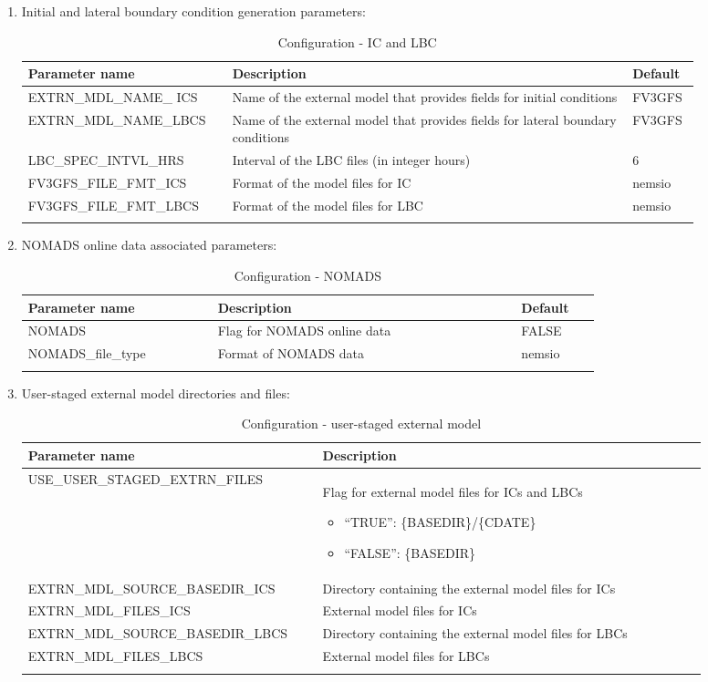 \documentclass[11pt,fleqn]{report}              %
\begin{document}
\begin{enumerate}
\item Initial and lateral boundary condition generation parameters:
{
\scriptsize
\begin{longtable}{p{0.25\linewidth} | p{0.55\linewidth} | p{0.08\linewidth}}
\hline
\hline
Parameter name & Description & Default \\
\hline
EXTRN\_MDL\_NAME\_ ICS & Name of the external model that provides fields for initial conditions & FV3GFS \\
EXTRN\_MDL\_NAME\_LBCS & Name of the external model that provides fields for lateral boundary conditions & FV3GFS \\
LBC\_SPEC\_INTVL\_HRS & Interval of the LBC files (in integer hours) & 6 \\
FV3GFS\_FILE\_FMT\_ICS & Format of the model files for IC  & nemsio \\
FV3GFS\_FILE\_FMT\_LBCS & Format of the model files for LBC  & nemsio \\
\hline
\caption{Configuration - IC and LBC}
\label{table:config_iclbc}
\end{longtable}
}

\item NOMADS online data associated parameters:
{
\scriptsize
\begin{longtable}{p{0.25\linewidth} | p{0.4\linewidth} | p{0.1\linewidth}}
\hline
\hline
Parameter name & Description & Default \\
\hline
NOMADS & Flag for NOMADS online data & FALSE \\
NOMADS\_file\_type & Format of NOMADS data & nemsio \\
\hline
\caption{Configuration - NOMADS}
\label{table:config_nomads}
\end{longtable}
}

\item User-staged external model directories and files:
{
\scriptsize
\begin{longtable}{p{0.37\linewidth} | p{0.52\linewidth} }
\hline
\hline
Parameter name & Description \\
\hline
USE\_USER\_STAGED\_EXTRN\_FILES& Flag for external model files for ICs and LBCs  \begin{itemize} \item ``TRUE'': \{BASEDIR\}/\{CDATE\}  \item ``FALSE'': \{BASEDIR\}  \end{itemize} \\
EXTRN\_MDL\_SOURCE\_BASEDIR\_ICS & Directory containing the external model files for ICs \\
EXTRN\_MDL\_FILES\_ICS & External model files for ICs  \\
EXTRN\_MDL\_SOURCE\_BASEDIR\_LBCS & Directory containing the external model files for LBCs   \\
EXTRN\_MDL\_FILES\_LBCS &  External model files for LBCs  \\
\hline
\caption{Configuration - user-staged external model}
\label{table:config_userextern}
\end{longtable}
}


\end{enumerate}
\end{document}
